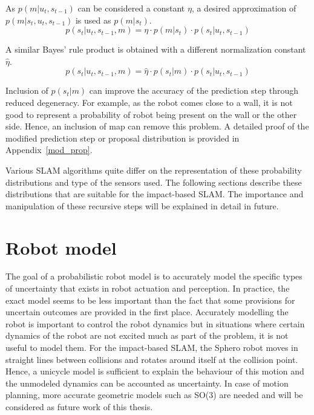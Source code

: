 As $p(m|u_t,s_{t-1})$ can be considered a constant $\eta$, a desired approximation of $p(m|s_t,u_t,s_{t-1})$ is used as $p(m|s_t)$.
\begin{equation}
p(s_t|u_t,s_{t-1},m) = \eta\cdot p(m|s_t)\cdot p(s_t|u_t,s_{t-1})
\end{equation}

A similar Bayes' rule product is obtained with a different normalization constant $\hat{\eta}$.
\begin{equation}
p(s_t|u_t,s_{t-1},m) = \hat{\eta}\cdot p(s_t|m)\cdot p(s_t|u_t,s_{t-1})
\end{equation}

Inclusion of $p(s_t|m)$ can improve the accuracy of the prediction step through reduced degeneracy. For example, as the robot comes close to a wall, it is not good to represent a probability of robot being present on the wall or the other side. Hence, an inclusion of map can remove this problem. A detailed proof of the modified prediction step or proposal distribution is provided in Appendix~\ref{mod_prop}.  

Various SLAM algorithms quite differ on the representation of these probability distributions and type of the sensors used. The following sections describe these distributions that are suitable for the impact-based SLAM. The importance and manipulation of these recursive steps will be explained in detail in future.

\section{Robot model} \label{sec::robotmodel}
The goal of a probabilistic robot model is to accurately model the specific types of uncertainty that exists in robot actuation and perception. In practice, the exact model seems to be less important than the fact that some provisions for uncertain outcomes are provided in the first place. Accurately modelling the robot is important to control the robot dynamics but in situations where certain dynamics of the robot are not excited much as part of the problem, it is not useful to model them. For the impact-based SLAM, the Sphero robot moves in straight lines between collisions and rotates around itself at the collision point.  Hence, a unicycle model is sufficient to explain the behaviour of this motion and the unmodeled dynamics can be accounted as uncertainty. In case of motion planning, more accurate geometric models such as SO(3) are needed and will be considered as future work of this thesis.

